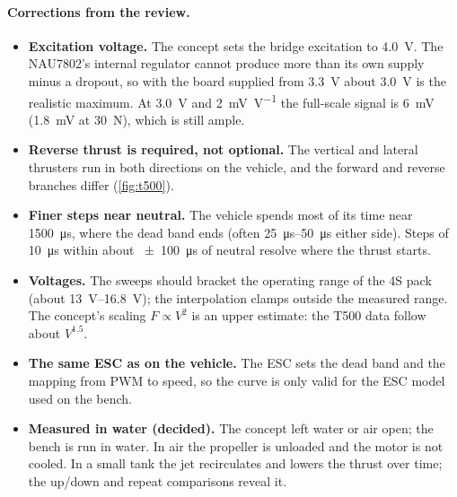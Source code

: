 \begin{revised}[title=Added 28 October 2026,breakable]
\paragraph{Corrections from the review.}
\begin{itemize}
  \item \textbf{Excitation voltage.} The concept sets the bridge excitation to \qty{4.0}{\volt}.
        The NAU7802's internal regulator cannot produce more than its own supply minus a dropout,
        so with the board supplied from \qty{3.3}{\volt} about \qty{3.0}{\volt} is the realistic
        maximum. At \qty{3.0}{\volt} and \qty{2}{\milli\volt\per\volt} the full-scale signal is
        \qty{6}{\milli\volt} (\qty{1.8}{\milli\volt} at \qty{30}{\newton}), which is still ample.
  \item \textbf{Reverse thrust is required, not optional.} The vertical and lateral thrusters run
        in both directions on the vehicle, and the forward and reverse branches differ
        (\cref{fig:t500}).
  \item \textbf{Finer steps near neutral.} The vehicle spends most of its time near
        \qty{1500}{\micro\second}, where the dead band ends (often \qtyrange{25}{50}{\micro\second}
        either side). Steps of \qty{10}{\micro\second} within about \qty{\pm 100}{\micro\second}
        of neutral resolve where the thrust starts.
  \item \textbf{Voltages.} The sweeps should bracket the operating range of the 4S pack
        (about \qtyrange{13}{16.8}{\volt}); the interpolation clamps outside the measured range.
        The concept's scaling $F \propto V^2$ is an upper estimate: the T500 data follow about
        $V^{1.5}$.
  \item \textbf{The same ESC as on the vehicle.} The ESC sets the dead band and the mapping from
        PWM to speed, so the curve is only valid for the ESC model used on the bench.
  \item \textbf{Measured in water (decided).} The concept left water or air open; the bench is
        run in water. In air the propeller is unloaded and the motor is not cooled. In a small
        tank the jet recirculates and lowers the thrust over time; the up/down and repeat
        comparisons reveal it.
\end{itemize}
\end{revised}

